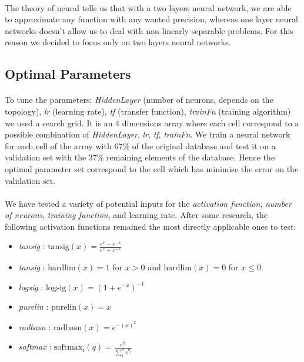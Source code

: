 \documentclass[a4paper,12pt,oneside,final]{report}
\begin{document}
\paragraph{}
The theory of neural tells us that with a two layers neural network, we are able to approximate any function with any wanted precision, whereas one layer neural networks doesn't allow us to deal with non-linearly separable problems. For this reason we decided to focus only on two layers neural networks.
\subsection{Optimal Parameters}
\label{ch:opset}
\paragraph{}
To tune the parameters: \textit{HiddenLayer} (number of neurons, depends on the topology), \textit{lr} (learning rate), \textit{tf} (transfer function), \textit{trainFn} (training algorithm) we used a search grid. It is an 4 dimensions array where each cell correspond to a possible combination of \textit{HiddenLayer}, \textit{lr}, \textit{tf}, \textit{trainFn}. We train a neural network for each cell of the array with 67\% of the original database and test it on a validation set with the 37\% remaining elements of the database. Hence the optimal parameter set correspond to the cell which has minimise the error on the validation set.
\paragraph{}
We have tested a variety of potential inputs for the \textit{activation function}, \textit{number of neurons}, \textit{training function}, and learning rate.  After some research, the following activation functions remained the most directly applicable ones to test:
\begin{itemize}
\item \textit{tansig} : $\text{tansig}(x) = \frac{e^x - e^{-x}}{e^x + e^{-x}}$
\item \textit{tansig} : $\text{hardlim}(x) = 1$ for $x>0$ and $\text{hardlim}(x) = 0$ for $x \leq 0$.
\item \textit{logsig} : $\text{logsig}(x) = (1 + e^{-x})^{-1}$
\item\textit{purelin} : $\text{purelin}(x) = x$
\item \textit{radbasn} : $\text{radbasn}(x) = e^{-(x)^2}$
\item \textit{softmax} : $\text{softmax}_i(q) = \frac{e^{q_i}}{\sum_1^n e^{q_j}}$
\end{itemize}
\end{document}
